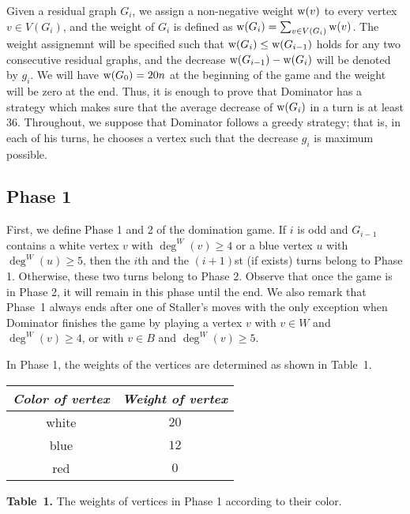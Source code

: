 \documentclass[12pt]{article}
\newcommand{\w}{{\rm w}}
\begin{document}
Given a residual graph $G_i$, we assign a non-negative weight $\w(v)$ to every vertex $v\in V(G_i)$, and the weight of $G_i$ is defined as $\w(G_i)=\sum_{v\in V(G_i)}\w(v)$. The weight assignemnt will be specified such that $\w(G_i) \le \w(G_{i-1})$ holds for any two consecutive residual graphs, and the decrease $\w(G_{i-1})-\w(G_{i})$ will be denoted by $g_i$. We will have $\w(G_0)=20 n$ at the beginning of the game and the weight will be zero at the end. Thus, it is enough to prove that Dominator has a strategy which makes sure that the average decrease of $\w(G_i)$ in a turn is at least $36$. Throughout, we suppose that Dominator follows a greedy strategy; that is, in each of his turns, he chooses a vertex such that the decrease $g_i$ is maximum possible.



\subsection*{Phase 1}

First, we define Phase 1 and 2 of the domination game. If $i$ is odd and $G_{i-1}$ contains a white vertex $v$ with $\deg^W(v)\ge 4$ or a blue vertex $u$ with $\deg^W(u)\ge 5$, then the $i$th and the $(i+1)$st (if exists) turns belong to Phase 1.
Otherwise, these two turns belong to Phase 2. Observe that once the game is in Phase 2, it will remain in this phase until the end. We also remark that Phase~1 always ends after one of Staller's moves with the only exception when Dominator finishes the game by playing a vertex $v$ with $v \in W$ and $\deg^W(v)\ge 4$, or with $v \in B$ and $\deg^W(v)\ge 5$. 

In Phase 1, the weights of the vertices are determined as shown in Table~1.
\begin{center}
\begin{tabular}{|c|c|}  \hline
\emph{Color of vertex} &  \emph{Weight of vertex} \\
 \hline
white &  $20$ \\
blue & $12$  \\
red & $0$  \\
 \hline
\end{tabular}
\end{center}
\begin{center}
\textbf{Table~1.} The weights of vertices in Phase 1 according to their color.
\end{center}
\end{document}
